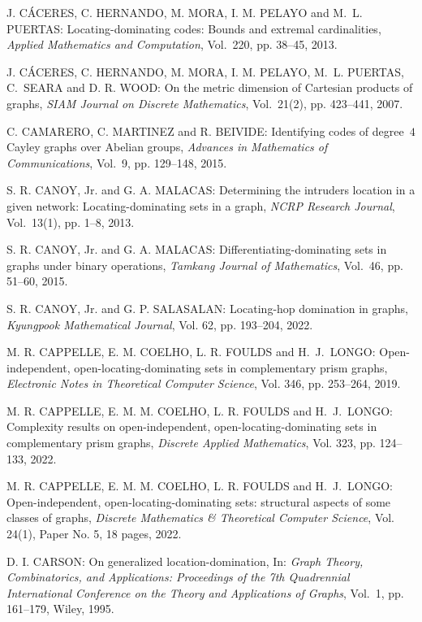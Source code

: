 \begin{thebibliography}{999}
J. C\'ACERES, C. HERNANDO, M. MORA, I. M. PELAYO and M.~L. PUERTAS: Locating-dominating codes: Bounds and extremal cardinalities, {\it Applied Mathematics and Computation}, Vol.~220, pp. 38--45, 2013.

J. C\'ACERES, C. HERNANDO, M. MORA, I. M. PELAYO, M.~L. PUERTAS, C.~SEARA and D. R. WOOD: On the metric dimension of Cartesian products of graphs, {\it SIAM Journal on Discrete Mathematics}, Vol.~21(2), pp. 423--441, 2007.

C. CAMARERO, C. MARTINEZ and R. BEIVIDE: Identifying codes of degree~$4$ Cayley graphs over Abelian groups, {\it Advances in Mathematics of Communications}, Vol.~9, pp. 129--148, 2015.

S. R. CANOY, Jr. and G. A. MALACAS: Determining the intruders location in a given network: Locating-dominating sets in a graph, {\it NCRP Research Journal}, Vol.~13(1), pp. 1--8, 2013.

S. R. CANOY, Jr. and G. A. MALACAS: Differentiating-dominating sets in graphs under binary operations, {\it Tamkang Journal of Mathematics}, Vol.~46, pp. 51--60, 2015.

S. R. CANOY, Jr. and G. P. SALASALAN: Locating-hop domination in graphs, {\it Kyungpook Mathematical Journal}, Vol. 62, pp. 193--204, 2022.

M. R. CAPPELLE, E. M. COELHO, L. R. FOULDS and H.~J.~LONGO: Open-independent, open-locating-dominating sets in complementary prism graphs, {\it Electronic Notes in Theoretical Computer Science}, Vol. 346, pp. 253--264, 2019.

M. R. CAPPELLE, E. M. M. COELHO, L. R. FOULDS and H.~J.~LONGO: Complexity results on open-independent, open-locating-dominating sets in complementary prism graphs, {\it Discrete Applied Mathematics}, Vol. 323, pp. 124--133, 2022.

M. R. CAPPELLE, E. M. M. COELHO, L. R. FOULDS and H.~J.~LONGO: Open-independent, open-locating-dominating sets: structural aspects of some classes of graphs, {\it Discrete Mathematics \& Theoretical Computer Science}, Vol. 24(1), Paper No. 5, 18 pages, 2022.

D. I. CARSON: On generalized location-domination, In: {\it Graph Theory, Combinatorics, and Applications: Proceedings of the 7th Quadrennial International Conference on the Theory and Applications of Graphs}, Vol.~1, pp. 161--179, Wiley, 1995.


\end{thebibliography}
